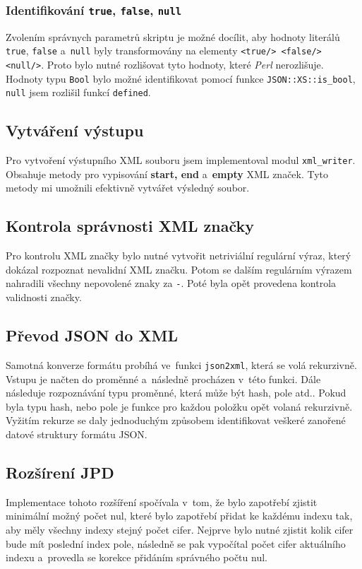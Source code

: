 \documentclass[10pt,a4paper]{article}
\begin{document}
\subsubsection{Identifikování \texttt{true}, \texttt{false}, \texttt{null}}
Zvolením správnych parametrů skriptu je možné docílit, aby hodnoty literálů
\texttt{true}, \texttt{false} a~\texttt{null} byly transformovány na elementy
\texttt{<true/> <false/> <null/>}. Proto bylo nutné rozlišovat tyto hodnoty, které
\emph{Perl} nerozlišuje. Hodnoty typu \texttt{Bool} bylo možné identifikovat
pomocí funkce \texttt{JSON::XS::is\_bool}, \texttt{null} jsem rozlišil funkcí \texttt{defined}.

\subsection{Vytváření výstupu}
Pro vytvoření výstupního XML souboru jsem implementoval modul \texttt{xml\_writer}.
Obsahuje metody pro vypisování \textbf{start, end} a~\textbf{empty} XML značek.
Tyto metody mi umožnili efektivně vytvářet výsledný soubor.


\subsection{Kontrola správnosti XML značky}
Pro kontrolu XML značky bylo nutné vytvořit netriviální regulární výraz, který
dokázal rozpoznat nevalidní XML značku. Potom se dalším regulárním výrazem
nahradili všechny nepovolené znaky za \texttt{-}. Poté byla opět provedena kontrola
validnosti značky.

\subsection{Převod JSON do XML}
Samotná konverze formátu probíhá ve~funkci \texttt{json2xml}, která se volá
rekurzivně. Vstupu je načten do proměnné a~následně procházen v~této
funkci. Dále následuje rozpoznávání typu proměnné, která může být hash, pole
atd.. Pokud byla typu hash, nebo pole je funkce pro každou položku opět volaná rekurzivně.
Vyžitím rekurze se daly jednoduchým způsobem identifikovat veškeré zanořené datové 
struktury formátu JSON.

\subsection{Rozšírení JPD}
Implementace tohoto rozšíření spočívala v~tom, že bylo zapotřebí zjistit minimální
možný počet nul, které bylo zapotřebí přidat ke každému indexu tak, aby měly všechny indexy
stejný počet cifer. Nejprve bylo nutné zjistit kolik cifer bude mít poslední
index pole, následně se pak vypočítal počet cifer aktuálního indexu a~provedla se
korekce přidáním správného počtu nul.
\end{document}
